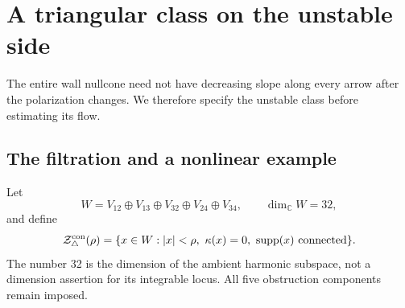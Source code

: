 \documentclass[11pt]{amsart}
\theoremstyle{definition}
\theoremstyle{remark}
\newcommand{\CC}{\mathbb C}
\newcommand{\supp}{\operatorname{supp}}
\begin{document}
\section{A triangular class on the unstable side}\label{sec:unstable}

The entire wall nullcone need not have decreasing slope along
every arrow after the polarization changes. We therefore specify
the unstable class before estimating its flow.

\subsection{The filtration and a nonlinear example}
Let
\[
 W=V_{12}\oplus V_{13}\oplus V_{32}\oplus V_{24}\oplus V_{34},
                 \qquad \dim_{\CC}W=32 ,
\]
and define
\begin{equation}\label{eq:unstable-domain}
 \mathcal Z_\triangle^{\rm con}(\rho)=
 \{x\in W:|x|<\rho,\ \kappa(x)=0,\
                          \supp(x)\text{ connected}\}.
\end{equation}
The number 32 is the dimension of the ambient harmonic subspace,
not a dimension assertion for its integrable locus. All five
obstruction components remain imposed.
\end{document}
